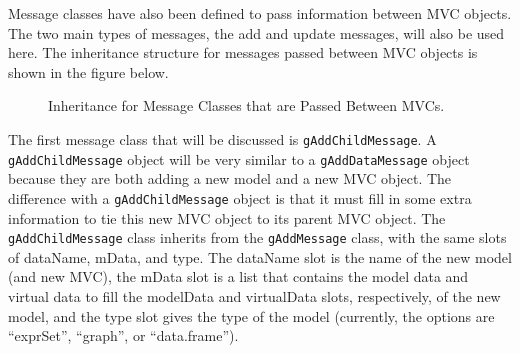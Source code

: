 \documentclass[11pt]{article}
\newcommand{\Robject}[1]{{\texttt{#1}}}
\begin{document}
Message classes have also been defined to pass information between MVC objects.
The two main types of messages, the add and update messages, will also be used 
here.  The inheritance structure for messages passed between MVC objects is 
shown in the figure below.
 
\clearpage

\begin{figure}[ht]
  \begin{center}
    \caption{ Inheritance for Message Classes that are Passed Between MVCs. }
    \label{Fig:BetwMess}
  \end{center}
\end{figure}

The first message class that will be discussed is \Robject{gAddChildMessage}.
A \Robject{gAddChildMessage} object will be very similar to a
\Robject{gAddDataMessage} object because they are both adding a new
model and a new MVC object.  The difference with a \Robject{gAddChildMessage}
object is that it must fill in some extra information to tie this new MVC
object to its parent MVC object.  The \Robject{gAddChildMessage} class
inherits from the \Robject{gAddMessage} class, with the same slots of
dataName, mData, and type.  The dataName slot is the name of the new model (and
new MVC), the mData slot is a list that contains the model data and virtual
data to fill the modelData and virtualData slots, respectively, of the new
model, and the type slot gives the type of the model (currently, the options
are ``exprSet'', ``graph'', or ``data.frame'').  
\end{document}
